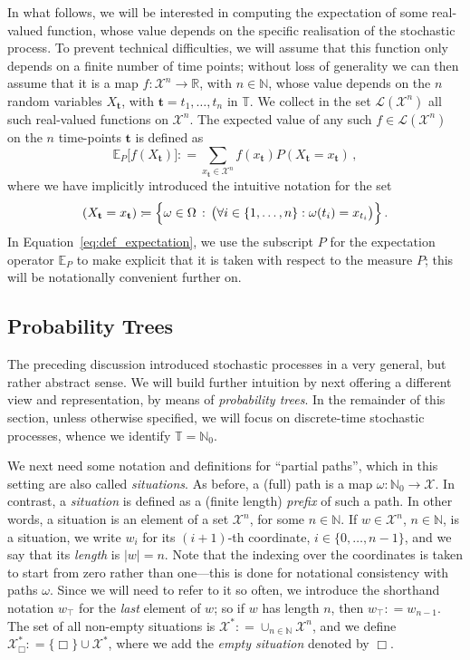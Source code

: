 \documentclass[graybox]{svmult}
\newcommand{\nats}{\mathbb{N}}
\newcommand{\natswith}{\nats_{0}}
\newcommand{\reals}{\mathbb{R}}
\newcommand{\states}{\mathcal{X}}
\newcommand{\gambles}{\mathcal{L}}
\newcommand{\coloneqq}{:\!=}
\newcommand{\timedim}{\mathbb{T}}
\begin{document}
In what follows, we will be interested in computing the expectation of some real-valued function, whose value depends on the specific realisation of the stochastic process. To prevent technical difficulties, we will assume that this function only depends on a finite number of time points; without loss of generality we can then assume that it is a map $f:\states^n\to\reals$, with $n\in\nats$, whose value depends on the $n$ random variables $X_\mathbf{t}$, with $\mathbf{t}=t_1,\ldots,t_{n}$ in $\timedim$. We collect in the set $\gambles(\states^n)$ all such real-valued functions on $\states^n$. The expected value of any such $f\in\gambles(\states^n)$ on the $n$ time-points $\mathbf{t}$ is defined as
\begin{equation}\label{eq:def_expectation}
\mathbb{E}_P\bigr[f(X_\mathbf{t})\bigr] \coloneqq \sum_{x_\mathbf{t}\in\states^n}f(x_\mathbf{t}) P(X_\mathbf{t}=x_\mathbf{t})\,,
\end{equation}
where we have implicitly introduced the intuitive notation for the set
\begin{equation*}
(X_\mathbf{t}=x_\mathbf{t}) \coloneqq \Bigl\{\omega\in\Omega\,:\,\bigl(\forall i\in\{1,\ldots,n\}:\omega(t_i)=x_{t_i}\bigr)\Bigr\}\,.
\end{equation*}
In Equation~\eqref{eq:def_expectation}, we use the subscript $P$ for the expectation operator $\mathbb{E}_P$ to make explicit that it is taken with respect to the measure $P$; this will be notationally convenient further on.


\subsection{Probability Trees}

The preceding discussion introduced stochastic processes in a very general, but rather abstract sense. We will build further intuition by next offering a different view and representation, by means of \emph{probability trees}. In the remainder of this section, unless otherwise specified, we will focus on discrete-time stochastic processes, whence we identify $\timedim=\natswith$.

We next need some notation and definitions for ``partial paths'', which in this setting are also called \emph{situations}. As before, a (full) path is a map $\omega:\natswith\to\states$. In contrast, a \emph{situation} is defined as a (finite length) \emph{prefix} of such a path. In other words, a situation is an element of a set $\states^{n}$, for some $n\in\nats$. If $w\in\states^n$, $n\in\nats$, is a situation, we write $w_i$ for its $(i+1)$-th coordinate, $i\in\{0,\ldots,n-1\}$, and we say that its \emph{length} is $\lvert w\rvert=n$. Note that the indexing over the coordinates is taken to start from zero rather than one---this is done for notational consistency with paths $\omega$. Since we will need to refer to it so often, we introduce the shorthand notation $w_\top$ for the \emph{last} element of $w$; so if $w$ has length $n$, then $w_\top\coloneqq w_{n-1}$. The set of all non-empty situations is $\states^*\coloneqq \cup_{n\in\nats}\states^n$, and we define $\states^*_\Box\coloneqq \{\Box\}\cup\states^*$, where we add the \emph{empty situation} denoted by $\Box$.
\end{document}
